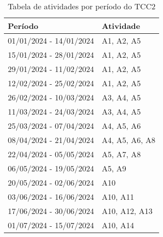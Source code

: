 \begin{table}[!ht]
\centering
\begin{tabularx}{\textwidth}{|X|X|}
\hline
\textbf{Período} & \textbf{Atividade} \\
\hline
01/01/2024 - 14/01/2024 & A1, A2, A5 \\ \hline
15/01/2024 - 28/01/2024 & A1, A2, A5 \\ \hline
29/01/2024 - 11/02/2024 & A1, A2, A5 \\ \hline
12/02/2024 - 25/02/2024 & A1, A2, A5 \\ \hline
26/02/2024 - 10/03/2024 & A3, A4, A5 \\ \hline
11/03/2024 - 24/03/2024 & A3, A4, A5 \\ \hline
25/03/2024 - 07/04/2024 & A4, A5, A6  \\ \hline
08/04/2024 - 21/04/2024 & A4, A5, A6, A8 \\ \hline
22/04/2024 - 05/05/2024 & A5, A7, A8 \\ \hline
06/05/2024 - 19/05/2024 & A5, A9 \\ \hline
20/05/2024 - 02/06/2024 & A10 \\ \hline
03/06/2024 - 16/06/2024 & A10, A11 \\ \hline
17/06/2024 - 30/06/2024 & A10, A12, A13 \\ \hline
01/07/2024 - 15/07/2024 & A10, A14 \\ \hline
\end{tabularx}
\caption{Tabela de atividades por período do TCC2}
\end{table}

